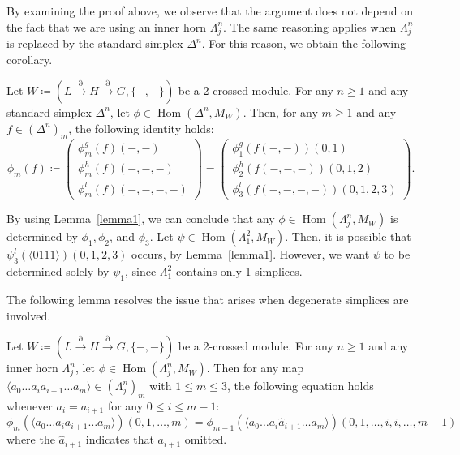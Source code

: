 \documentclass{tac}
\begin{document}
By examining the proof above, we observe that the argument does not depend on the fact that we are using an inner horn \( \Lambda^n_j \). The same reasoning applies when \( \Lambda^n_j \) is replaced by the standard simplex \( \Delta^n \). For this reason, we obtain the following corollary.

\begin{corollary}
Let \( W \coloneqq (L \xrightarrow{\partial} H \xrightarrow{\partial} G, \{-,-\}) \) be a 2-crossed module. For any \( n \ge 1 \) and any standard simplex \( \Delta^n \), let \( \phi \in \operatorname{Hom}( \Delta^n, M_W) \). Then, for any \( m \ge 1 \) and any \( f \in (\Delta^n)_m \), the following identity holds:
\[
\phi_m(f) 
\coloneqq
\begin{pmatrix}
\phi^g_m(f)(-,-) \\
\phi^h_m(f)(-,-,-) \\
\phi^l_m(f)(-,-,-,-)
\end{pmatrix}
=
\begin{pmatrix}
\phi^g_1(f(-,-))(0,1) \\
\phi^h_2(f(-,-,-))(0,1,2) \\
\phi^l_3(f(-,-,-,-))(0,1,2,3)
\end{pmatrix}.
\]
\end{corollary}

By using Lemma~\ref{lemma1}, we can conclude that any $\phi \in \operatorname{Hom}(\Lambda^n_j, M_W)$ is determined by $\phi_1, \phi_2$, and $\phi_3$.
Let $\psi \in \operatorname{Hom}(\Lambda^2_1, M_W)$. Then, it is possible that $\psi^l_3(\langle 0111 \rangle)(0,1,2,3)$ occurs, by Lemma~\ref{lemma1}.
However, we want $\psi$ to be determined solely by $\psi_1$, since $\Lambda^2_1$ contains only 1-simplices.

The following lemma resolves the issue that arises when degenerate simplices are involved.

\begin{lemma}
\label{lemma2}

Let \( W \coloneqq (L \xrightarrow{\partial} H \xrightarrow{\partial} G, \{-,-\}) \) be a 2-crossed module. For any \( n \ge 1 \) and any inner horn \( \Lambda^n_j \), let \( \phi \in \operatorname{Hom}(\Lambda^n_j, M_W) \). Then for any map $ \langle a_0 \dots a_i a_{i+1}\dots a_m  \rangle \in (\Lambda^n_j)_m $ with \(1\le m \le 3 \), the following equation holds whenever $a_i = a_{i+1}$ for any $0\le i  \le m-1$:
\[
\phi_m (\langle a_0 \dots a_i a_{i+1}\dots a_m \rangle) (0,1,\dots, m) = \phi_{m-1} (\langle a_0 \dots a_i \hat{a}_{i+1}\dots a_m \rangle) (0,1,\dots, i,i,\dots,m-1)
\]
where the $\hat{a}_{i+1}$ indicates that ${a}_{i+1}$ omitted.

\end{lemma}
\end{document}
